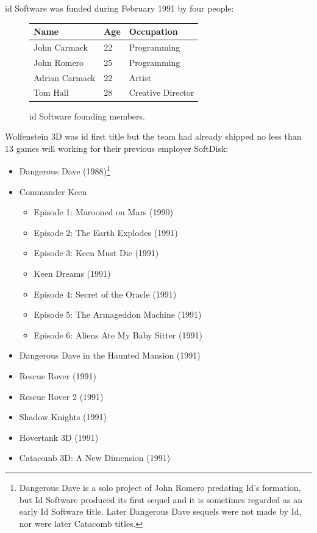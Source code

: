 \documentclass[book.tex]{subfiles}
\begin{document}
id Software was funded during February 1991 by four people: 

 \begin{figure}[H]
\centering  
\begin{tabularx}{\textwidth}{ X  X  X  }
  \toprule
  \textbf{Name} &  \textbf{Age} & \textbf{Occupation} \\
  \toprule 
   John Carmack & 22 &  Programming\\
   John Romero & 25 &  Programming\\
   Adrian Carmack & 22 &  Artist\\
   Tom Hall & 28 &  Creative Director\\
     \toprule
\end{tabularx}
\caption{id Software founding members.}\label{fig:Id Software team}
\end{figure}

Wolfenstein 3D was id first title but the team had already shipped no less than 13 games will working for their previous employer SoftDisk:\\
\begin{itemize}
  \item Dangerous Dave (1988)\footnote{Dangerous Dave is a solo project of John Romero predating Id's formation, but Id Software produced its first sequel and it is sometimes regarded as an early Id Software title. Later Dangerous Dave sequels were not made by Id, nor were later Catacomb titles.}
  \item Commander Keen
  \begin{itemize}
    \item Episode 1: Marooned on Mars (1990)
    \item Episode 2: The Earth Explodes (1991)
    \item Episode 3: Keen Must Die (1991)
    \item Keen Dreams (1991)
    \item Episode 4: Secret of the Oracle (1991)
    \item Episode 5: The Armageddon Machine (1991)
    \item Episode 6: Aliens Ate My Baby Sitter (1991)
  \end{itemize}
  
  \item Dangerous Dave in the Haunted Mansion (1991)
  \item Rescue Rover (1991)
  \item Rescue Rover 2 (1991)
  \item Shadow Knights (1991)
  \item Hovertank 3D (1991)
  \item Catacomb 3D: A New Dimension (1991)
\end{itemize}
\end{document}
